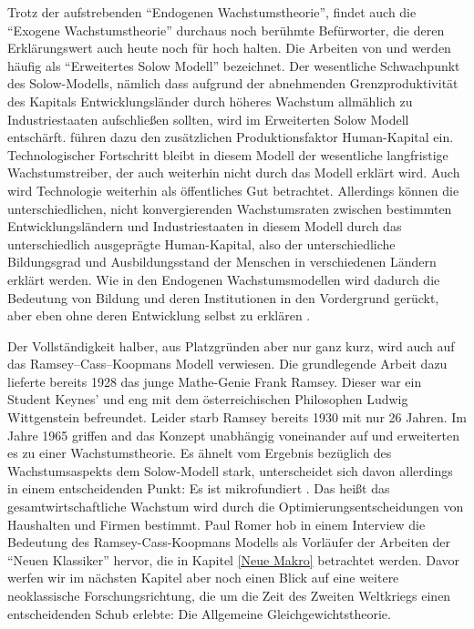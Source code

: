 Trotz der aufstrebenden "`Endogenen Wachstumstheorie"', findet auch die "`Exogene Wachstumstheorie"' durchaus noch berühmte Befürworter, die deren Erklärungswert auch heute noch für hoch halten. Die Arbeiten von \textcite{Mankiw1992} und \textcite{Mankiw1995} werden häufig als "`Erweitertes Solow Modell"' bezeichnet. Der wesentliche Schwachpunkt des Solow-Modells, nämlich dass aufgrund der abnehmenden Grenzproduktivität des Kapitals Entwicklungsländer durch höheres Wachstum allmählich zu Industriestaaten aufschließen sollten, wird im Erweiterten Solow Modell entschärft. \textcite{Mankiw1992} führen dazu den zusätzlichen Produktionsfaktor Human-Kapital ein. Technologischer Fortschritt bleibt in diesem Modell der wesentliche langfristige Wachstumstreiber, der auch weiterhin nicht durch das Modell erklärt wird. Auch wird Technologie weiterhin als öffentliches Gut betrachtet. Allerdings können die unterschiedlichen, nicht konvergierenden Wachstumsraten zwischen bestimmten Entwicklungsländern und Industriestaaten in diesem Modell durch das unterschiedlich ausgeprägte Human-Kapital, also der unterschiedliche Bildungsgrad und Ausbildungsstand der Menschen in verschiedenen Ländern erklärt werden. Wie in den Endogenen Wachstumsmodellen wird dadurch die Bedeutung von Bildung und deren Institutionen in den Vordergrund gerückt, aber eben ohne deren Entwicklung selbst zu erklären \parencite[S. 150]{Romer2019}. 

Der Vollständigkeit halber, aus Platzgründen aber nur ganz kurz, wird auch auf das Ramsey–Cass–Koopmans Modell verwiesen. Die grundlegende Arbeit dazu \parencite{Ramsey1928} lieferte bereits 1928 das junge Mathe-Genie Frank Ramsey. Dieser war ein Student Keynes' und eng mit dem österreichischen Philosophen Ludwig Wittgenstein befreundet. Leider starb Ramsey bereits 1930 mit nur 26 Jahren. Im Jahre 1965 griffen \textcite{Cass1965} and \textcite{Koopmans1965} das Konzept unabhängig voneinander auf und erweiterten es zu einer Wachstumstheorie. Es ähnelt vom Ergebnis bezüglich des Wachstumsaspekts dem Solow-Modell stark, unterscheidet sich davon allerdings in einem entscheidenden Punkt: Es ist mikrofundiert \parencite[S. 50]{Romer2019}. Das heißt das gesamtwirtschaftliche Wachstum wird durch die Optimierungsentscheidungen von Haushalten und Firmen bestimmt. Paul Romer hob in einem Interview \parencite[S. 675]{Snowdon2005} die Bedeutung des Ramsey-Cass-Koopmans Modells als Vorläufer der Arbeiten der "`Neuen Klassiker"' hervor, die in Kapitel \ref{Neue Makro} betrachtet werden. Davor werfen wir im nächsten Kapitel aber noch einen Blick auf eine weitere neoklassische Forschungsrichtung, die um die Zeit des Zweiten Weltkriegs einen entscheidenden Schub erlebte: Die Allgemeine Gleichgewichtstheorie.


